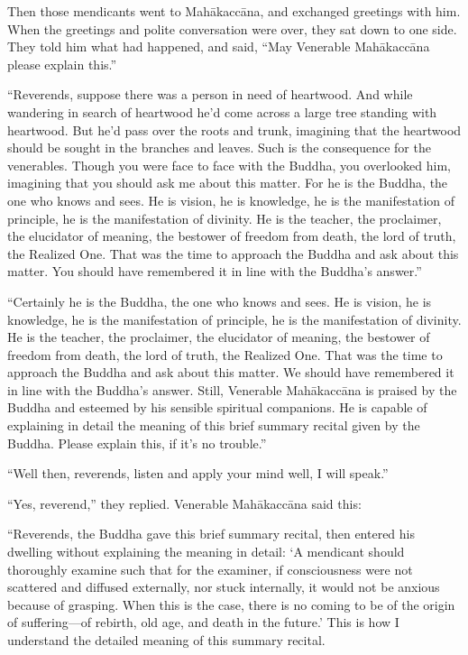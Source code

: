 \documentclass[12pt,openany]{book}%
\begin{document}
Then those mendicants went to \textsanskrit{Mahākaccāna}, and exchanged greetings with him. When the greetings and polite conversation were over, they sat down to one side. They told him what had happened, and said, “May Venerable \textsanskrit{Mahākaccāna} please explain this.” 

“Reverends, suppose there was a person in need of heartwood. And while wandering in search of heartwood he’d come across a large tree standing with heartwood. But he’d pass over the roots and trunk, imagining that the heartwood should be sought in the branches and leaves. Such is the consequence for the venerables. Though you were face to face with the Buddha, you overlooked him, imagining that you should ask me about this matter. For he is the Buddha, the one who knows and sees. He is vision, he is knowledge, he is the manifestation of principle, he is the manifestation of divinity. He is the teacher, the proclaimer, the elucidator of meaning, the bestower of freedom from death, the lord of truth, the Realized One. That was the time to approach the Buddha and ask about this matter. You should have remembered it in line with the Buddha’s answer.” 

“Certainly he is the Buddha, the one who knows and sees. He is vision, he is knowledge, he is the manifestation of principle, he is the manifestation of divinity. He is the teacher, the proclaimer, the elucidator of meaning, the bestower of freedom from death, the lord of truth, the Realized One. That was the time to approach the Buddha and ask about this matter. We should have remembered it in line with the Buddha’s answer. Still, Venerable \textsanskrit{Mahākaccāna} is praised by the Buddha and esteemed by his sensible spiritual companions. He is capable of explaining in detail the meaning of this brief summary recital given by the Buddha. Please explain this, if it’s no trouble.” 

“Well then, reverends, listen and apply your mind well, I will speak.” 

“Yes, reverend,” they replied. Venerable \textsanskrit{Mahākaccāna} said this: 

“Reverends, the Buddha gave this brief summary recital, then entered his dwelling without explaining the meaning in detail: ‘A mendicant should thoroughly examine such that for the examiner, if consciousness were not scattered and diffused externally, nor stuck internally, it would not be anxious because of grasping. When this is the case, there is no coming to be of the origin of suffering—of rebirth, old age, and death in the future.’ This is how I understand the detailed meaning of this summary recital. 
\end{document}
